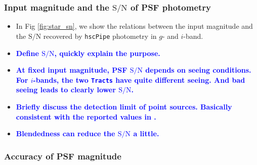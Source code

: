 \documentclass[useamsfonts]{pasj01}
\def\hscpipe{\texttt{hscPipe}}
\def\tracts{\texttt{Tracts}}
\newcommand{\plan}[1]{\textcolor{blue} {\textbf{#1}}}
\begin{document}
\subsubsection{Input magnitude and the $\mathrm{S}/\mathrm{N}$ of PSF photometry}
    
    \begin{itemize}
        
        \item In Fig \ref{fig:star_sn}, we show the relations between the input
            magnitude and the $\mathrm{S}/\mathrm{N}$ recovered by \hscpipe{}
            photometry in $g$- and $i$-band.
        
        \item \plan{Define $\mathrm{S}/\mathrm{N}$, quickly explain the purpose.}
        
        \item \plan{At fixed input magnitude, PSF $\mathrm{S}/\mathrm{N}$ depends 
            on seeing conditions. 
            For $i$-bands, the two \tracts{} have quite different seeing. 
            And bad seeing leads to clearly lower $\mathrm{S}/\mathrm{N}$.}
        
        \item \plan{Briefly discuss the detection limit of point sources. 
            Basically consistent with the reported values in \citet{HSCDR1}.}
            
        \item \plan{Blendedness can reduce the $\mathrm{S}/\mathrm{N}$ a little.}
    
    \end{itemize}

\subsubsection{Accuracy of PSF magnitude}
\end{document}

